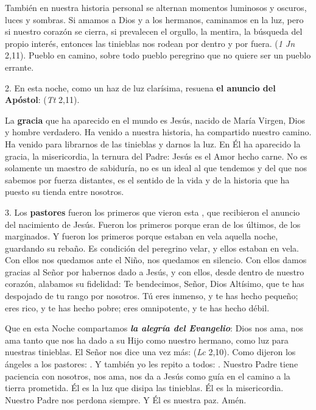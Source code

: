 También en nuestra historia personal se alternan momentos luminosos y oscuros, luces y sombras. Si amamos a Dios y a los hermanos, caminamos en la luz, pero si nuestro corazón se cierra, si prevalecen el orgullo, la mentira, la búsqueda del propio interés, entonces las tinieblas nos rodean por dentro y por fuera.  (\emph{1 Jn} 2,11). Pueblo en camino, sobre todo pueblo peregrino que no quiere ser un pueblo errante.

2. En esta noche, como un haz de luz clarísima, resuena \textbf{el anuncio del Apóstol}:  (\emph{Tt} 2,11).

La \textbf{gracia} que ha aparecido en el mundo es Jesús, nacido de María Virgen, Dios y hombre verdadero. Ha venido a nuestra historia, ha compartido nuestro camino. Ha venido para librarnos de las tinieblas y darnos la luz. En Él ha aparecido la gracia, la misericordia, la ternura del Padre: Jesús es el Amor hecho carne. No es solamente un maestro de sabiduría, no es un ideal al que tendemos y del que nos sabemos por fuerza distantes, es el sentido de la vida y de la historia que ha puesto su tienda entre nosotros.

3. Los \textbf{pastores} fueron los primeros que vieron esta , que recibieron el anuncio del nacimiento de Jesús. Fueron los primeros porque eran de los últimos, de los marginados. Y fueron los primeros porque estaban en vela aquella noche, guardando su rebaño. Es condición del peregrino velar, y ellos estaban en vela. Con ellos nos quedamos ante el Niño, nos quedamos en silencio. Con ellos damos gracias al Señor por habernos dado a Jesús, y con ellos, desde dentro de nuestro corazón, alabamos su fidelidad: Te bendecimos, Señor, Dios Altísimo, que te has despojado de tu rango por nosotros. Tú eres inmenso, y te has hecho pequeño; eres rico, y te has hecho pobre; eres omnipotente, y te has hecho débil.

Que en esta Noche compartamos \emph{\textbf{la alegría del Evangelio}}: Dios nos ama, nos ama tanto que nos ha dado a su Hijo como nuestro hermano, como luz para nuestras tinieblas. El Señor nos dice una vez más:  (\emph{Lc} 2,10). Como dijeron los ángeles a los pastores: . Y también yo les repito a todos: . Nuestro Padre tiene paciencia con nosotros, nos ama, nos da a Jesús como guía en el camino a la tierra prometida. Él es la luz que disipa las tinieblas. Él es la misericordia. Nuestro Padre nos perdona siempre. Y Él es nuestra paz. Amén.

